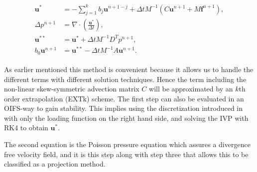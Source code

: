 \begin{align}
    \begin{split}
        \mathbf{u}^{*} &= -\sum_{j=1}^kb_{j}\mathbf{u}^{n+1-j}
        +\Delta t M^{-1} (C\mathbf{u}^{n+1}+M\mathbf{f}^{n+1}),\\
        \Delta p^{n+1} &= \nabla \cdot \left(  \frac{\mathbf{u}^{*}}{\Delta t}\right),\\
        \mathbf{u}^{**} &= \mathbf{u}^{*} + \Delta t M^{-1}D^T p^{n+1},\\
        b_0\mathbf{u}^{n+1} &= \mathbf{u}^{**} -\Delta t M^{-1} A\mathbf{u}^{n+1}.
    \end{split}
    \label{eq:fracstep}
\end{align}

As earlier mentioned this method is convenient because it allows us to handle the different 
terms with different solution techniques. Hence the term including the
non-linear skew-symmetric advection matrix $C$ will be approximated by
an $k$th order extrapolation (EXTk) scheme. The first step can also be evaluated in 
an OIFS-way to gain stability. This implies using the discretization introduced in 
with only the loading function on the right hand side, and solving the
IVP  with RK4 to obtain $\mathbf{u}^{*}$. 

The second equation is the Poisson pressure equation which
assures a divergence free velocity field, and it is this step along with step three that 
allows this to be classified as a projection method.

